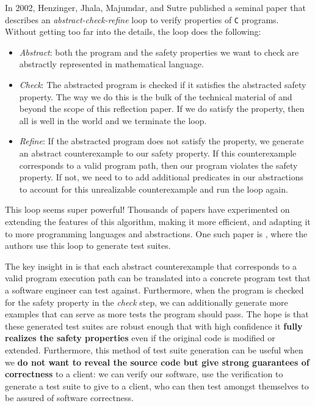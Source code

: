 \documentclass[acmsmall,review, nonacm]{acmart}
\begin{document}
In 2002, Henzinger, Jhala, Majumdar, and Sutre published a seminal paper \cite{henzinger2002lazy} that describes an \textit{abstract-check-refine} loop to verify properties of \texttt{C} programs. Without getting too far into the details, the loop does the following:
\begin{itemize}
  \item \textit{Abstract}: both the program and the safety properties we want to check are abstractly represented in mathematical language.
  \item \textit{Check}: The abstracted program is checked if it satisfies the abstracted safety property. The way we do this is the bulk of the technical material of \cite{henzinger2002lazy} and beyond the scope of this reflection paper. If we do satisfy the property, then all is well in the world and we terminate the loop.
  \item \textit{Refine}: If the abstracted program does not satisfy the property, we generate an abstract counterexample to our safety property. If this counterexample corresponds to a valid program path, then our program violates the safety property. If not, we need to to add additional predicates in our abstractions to account for this unrealizable counterexample and run the loop again.
\end{itemize}

This loop seems super powerful! Thousands of papers have experimented on extending the features of this algorithm, making it more efficient, and adapting it to more programming languages and abstractions. One such paper is \cite{beyer2004generating}, where the authors use this loop to generate test suites. 

The key insight in \cite{beyer2004generating} is that each abstract counterexample that corresponds to a valid program execution path can be translated into a concrete program test that a software engineer can test against. Furthermore, when the program is checked for the safety property in the \textit{check} step, we can additionally generate more examples that can serve as more tests the program should pass. The hope is that these generated test suites are robust enough that with high confidence it \textbf{fully realizes the safety properties} even if the original code is modified or extended. Furthermore, this method of test suite generation can be useful when we \textbf{do not want to reveal the source code but give strong guarantees of correctness} to a client: we can verify our software, use the verification to generate a test suite to give to a client, who can then test amongst themselves to be assured of software correctness. 
\end{document}
